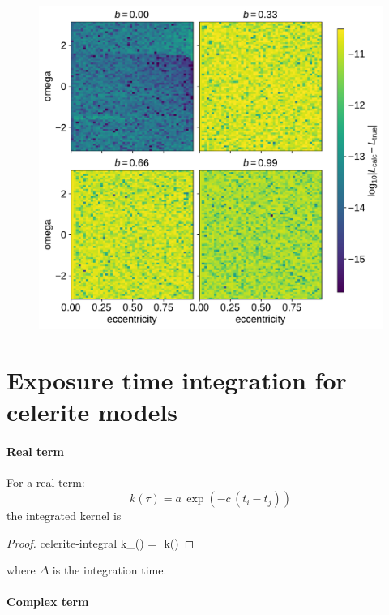 \documentclass[modern]{aastex62}
\begin{document}
\begin{figure}[htbp]
\begin{centering}
\includegraphics[width=0.8\linewidth]{figures/contact_points.pdf}
\end{centering}
\end{figure}

\section{Exposure time integration for celerite models}

\paragraph{Real term}

For a real term:
\begin{equation}
k(\tau) = a\,\exp\left(-c\,(t_i - t_j)\right)
\end{equation}
the integrated kernel is
\begin{proof}{celerite-integral}
k_\Delta(\tau) = \,\,k(\tau)
\end{proof}
where $\Delta$ is the integration time.

\paragraph{Complex term}
\end{document}
